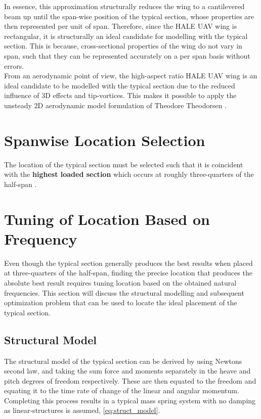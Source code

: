 In essence, this approximation structurally reduces the wing to a cantilevered
beam up until the span-wise position of the typical section, whose properties
are then represented per unit of span. Therefore, since the HALE UAV wing is
rectangular, it is structurally an ideal candidate for modelling with the
typical section. This is because, cross-sectional properties of the wing do not
vary in span, such that they can be represented accurately on a per span basis
without errors.\\

From an aerodynamic point of view, the high-aspect ratio HALE UAV wing is an
ideal candidate to be modelled with the typical section due to the reduced
influence of 3D effects and tip-vortices. This makes it possible to apply the
unsteady 2D aerodynamic model formulation of Theodore Theodorsen
\autocite{ReportNo4961935}.

\section{Spanwise Location Selection}
The location of the typical section must be selected such that it is coincident
with the \textbf{highest loaded section} which occurs at roughly three-quarters
of the half-span \autocite[p.533]{bisplinghoffAeroelasticity1996}.

\section{Tuning of Location Based on Frequency}
\label{sec:tuning}
Even though the typical section generally produces the best results when
placed at three-quarters of the half-span, finding the precise location that
produces the absolute best result requires tuning location based on
the obtained natural frequencies. This section will discuss the structural
modelling and subsequent optimization problem that can be used to locate
the ideal placement of the typical section.

\subsection{Structural Model}
The structural model of the typical section can be derived by using Newtons
second law, and taking the sum force and moments separately in the heave and
pitch degrees of freedom respectively. These are then equated to the freedom
and equating it to the time rate of change of the linear and angular momentum.
Completing this process results in a typical mass spring system with no damping
as linear-structures is assumed, \cref{eq:struct_model}.

